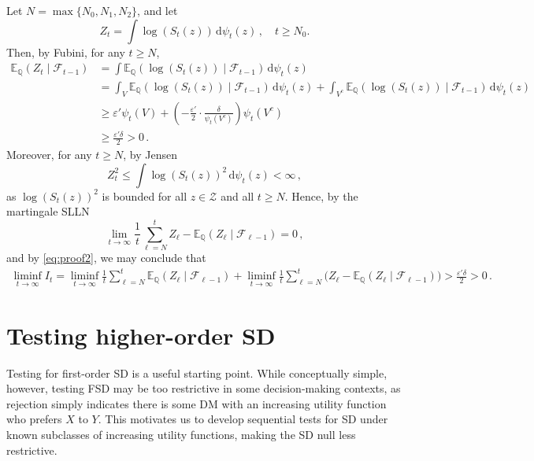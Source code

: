 \documentclass[12pt,twoside]{article}
\theoremstyle{plain}
\theoremstyle{definition}
\theoremstyle{remark}
\newcommand{\calF}{\mathcal{F}}
\newcommand{\calZ}{\mathcal{Z}}
\newcommand{\Esymb}{\mathbb{E}}
\newcommand{\Qsymb}{\mathbb{Q}}
\newcommand{\diff}{\,\mathrm{d}}
\renewcommand{\epsilon}{\varepsilon}
\begin{document}
Let $N= \max\{N_0,N_1,N_2\}$, and let 
\begin{equation*}
    Z_t = \int \log (S_t(z)) \diff \psi_t ( z)\,,\quad t\geq N_0.
\end{equation*}
Then, by Fubini, for any $t\geq N$,
\begin{align}
    \Esymb_{\Qsymb}(Z_t \mid \calF_{t-1}) &= \int  \Esymb_{\Qsymb}(\log (S_t(z)) \mid \calF_{t-1}) \diff \psi_t ( z)\nonumber \\
    &= \int_V  \Esymb_{\Qsymb}(\log (S_t(z)) \mid \calF_{t-1}) \diff \psi_t ( z) +\int_{V^c}  \Esymb_{\Qsymb}(\log (S_t(z)) \mid \calF_{t-1}) \diff \psi_t ( z) \nonumber\\
    &\geq \epsilon'\psi_t (V) +\left(-\frac{\epsilon'}{2}\cdot\frac{\delta}{\psi_t(V^c)}\right)  \psi_t (V^c)\nonumber\\
    &\geq\frac{\epsilon' \delta}{2}>0\,.  \label{eq:proof2}
\end{align}
Moreover, for any $t\geq N$, by Jensen
\begin{equation*}
  Z_t^2 \leq \int \log (S_t(z))^2 \diff  \psi_t ( z) < \infty\,,
\end{equation*}
as $\log (S_t(z))^2$ is bounded for all $z\in \calZ$ and all $t\geq N$. Hence, by the martingale SLLN
 \begin{equation*}
        \lim_{t\to \infty}\frac{1}{t}\sum_{\ell=N}^t  Z_\ell -  \Esymb_{\Qsymb}(Z_\ell \mid \calF_{\ell-1}) =0\,,
    \end{equation*}
and by \eqref{eq:proof2}, we may conclude that
\begin{align*}
   \liminf_{t\to \infty} I_t = \liminf_{t\to \infty} \frac{1}{t} \sum_{\ell=N}^{t} \Esymb_{\Qsymb}(Z_\ell \mid \calF_{\ell-1}) +\liminf_{t\to \infty} \frac{1}{t} \sum_{\ell=N}^{t} \big(Z_\ell-\Esymb_{\Qsymb}(Z_\ell \mid \calF_{\ell-1})\big) >\frac{\epsilon' \delta}{2}>0 \,.
\end{align*}


\section{Testing higher-order SD}\label{sec:testing_higher_order_SD}

Testing for first-order SD is a useful starting point. 
While conceptually simple, however, testing FSD may be too restrictive in some decision-making contexts, as rejection simply indicates there is some DM with an increasing utility function who prefers $X$ to $Y$. 
This motivates us to develop sequential tests for SD under known subclasses of increasing utility functions, making the SD null less restrictive. 
\end{document}

